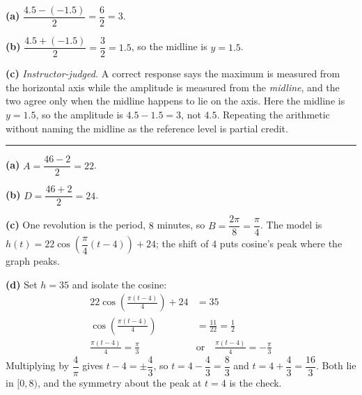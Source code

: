 \documentclass[12pt]{article}
\begin{document}

\textbf{(a)} $\dfrac{4.5 - (-1.5)}{2} = \dfrac{6}{2} = 3$. 

\textbf{(b)} $\dfrac{4.5 + (-1.5)}{2} = \dfrac{3}{2} = 1.5$, so the midline is $y = 1.5$. 

\textbf{(c)} \emph{Instructor-judged.} A correct response says the maximum is measured from the horizontal axis while the amplitude is measured from the \emph{midline}, and the two agree only when the midline happens to lie on the axis. Here the midline is $y = 1.5$, so the amplitude is $4.5 - 1.5 = 3$, not $4.5$. Repeating the arithmetic without naming the midline as the reference level is partial credit.

\vspace{0.1cm}\noindent\rule{\linewidth}{0.2pt}\vspace{0.1cm}


\textbf{(a)} $A = \dfrac{46 - 2}{2} = 22$. 

\textbf{(b)} $D = \dfrac{46 + 2}{2} = 24$. 

\textbf{(c)} One revolution is the period, $8$ minutes, so $B = \dfrac{2\pi}{8} = \dfrac{\pi}{4}$. The model is $h(t) = 22\cos\!\left(\dfrac{\pi}{4}(t - 4)\right) + 24$; the shift of $4$ puts cosine's peak where the graph peaks. 

\textbf{(d)} Set $h = 35$ and isolate the cosine:
\begin{align*}
  22\cos\!\left(\frac{\pi(t-4)}{4}\right) + 24 &= 35 \\
  \cos\!\left(\frac{\pi(t-4)}{4}\right) &= \frac{11}{22} = \frac{1}{2} \\
  \frac{\pi(t-4)}{4} = \frac{\pi}{3} \quad&\text{or}\quad \frac{\pi(t-4)}{4} = -\frac{\pi}{3}
\end{align*}
Multiplying by $\dfrac{4}{\pi}$ gives $t - 4 = \pm\dfrac{4}{3}$, so $t = 4 - \dfrac{4}{3} = \dfrac{8}{3}$ and $t = 4 + \dfrac{4}{3} = \dfrac{16}{3}$. Both lie in $[0, 8)$, and the symmetry about the peak at $t = 4$ is the check. 
\end{document}

